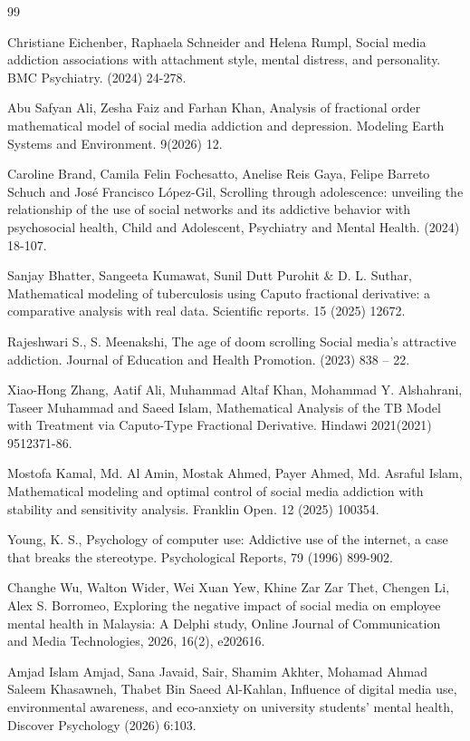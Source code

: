 \documentclass[10pt]{NSP1}
\begin{document}
\begin{thebibliography}{99}

Christiane Eichenber, Raphaela Schneider and Helena Rumpl, Social media addiction associations with attachment style, mental distress, and personality. BMC Psychiatry. (2024) 24-278.

Abu Safyan Ali, Zesha Faiz and Farhan Khan, Analysis of fractional order mathematical model of social media addiction and depression. Modeling Earth Systems and Environment. 9(2026) 12.

Caroline Brand, Camila Felin Fochesatto, Anelise Reis Gaya, Felipe Barreto Schuch and José Francisco López-Gil, Scrolling through adolescence: unveiling the relationship of the use of social networks and its addictive behavior with psychosocial health, Child and Adolescent, Psychiatry and Mental Health. (2024) 18-107.

Sanjay Bhatter, Sangeeta Kumawat, Sunil Dutt Purohit \& D. L. Suthar, Mathematical modeling of tuberculosis using Caputo fractional derivative: a comparative analysis with real data. Scientific reports. 15 (2025) 12672.

Rajeshwari S., S. Meenakshi, The age of doom scrolling Social media's attractive addiction. Journal of Education and Health Promotion. (2023) 838 – 22.

Xiao-Hong Zhang, Aatif Ali, Muhammad Altaf Khan, Mohammad Y. Alshahrani, Taseer Muhammad and Saeed Islam, Mathematical Analysis of the TB Model with Treatment via Caputo-Type Fractional Derivative. Hindawi 2021(2021) 9512371-86.

Mostofa Kamal, Md. Al Amin, Mostak Ahmed, Payer Ahmed, Md. Asraful Islam, Mathematical modeling and optimal control of social media addiction with stability and sensitivity analysis. Franklin Open. 12 (2025) 100354.

Young, K. S., Psychology of computer use: Addictive use of the internet, a case that breaks the stereotype. Psychological Reports, 79 (1996) 899-902.

Changhe Wu, Walton Wider, Wei Xuan Yew, Khine Zar Zar Thet, Chengen Li, Alex S. Borromeo, Exploring the negative impact of social media on employee mental health in Malaysia: A Delphi study, Online Journal of Communication and Media Technologies, 2026, 16(2), e202616.

Amjad Islam Amjad, Sana Javaid, Sair, Shamim Akhter, Mohamad Ahmad Saleem Khasawneh, Thabet Bin Saeed Al-Kahlan, Influence of digital media use, environmental awareness, and eco-anxiety on university students' mental health, Discover Psychology (2026) 6:103.


\end{thebibliography}
\end{document}
